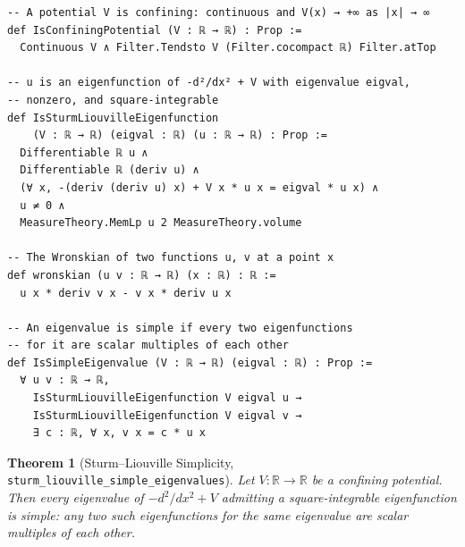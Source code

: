 \documentclass[12pt, a4paper]{article}
\theoremstyle{plain}
\newtheorem{theorem}{Theorem}[section]
\theoremstyle{definition}
\newcommand{\R}{\mathbb{R}}
\newcommand{\lean}[1]{\texttt{#1}}
\begin{document}
\begin{lstlisting}[language=Lean4]
-- A potential V is confining: continuous and V(x) → +∞ as |x| → ∞
def IsConfiningPotential (V : ℝ → ℝ) : Prop :=
  Continuous V ∧ Filter.Tendsto V (Filter.cocompact ℝ) Filter.atTop

-- u is an eigenfunction of -d²/dx² + V with eigenvalue eigval,
-- nonzero, and square-integrable
def IsSturmLiouvilleEigenfunction
    (V : ℝ → ℝ) (eigval : ℝ) (u : ℝ → ℝ) : Prop :=
  Differentiable ℝ u ∧
  Differentiable ℝ (deriv u) ∧
  (∀ x, -(deriv (deriv u) x) + V x * u x = eigval * u x) ∧
  u ≠ 0 ∧
  MeasureTheory.MemLp u 2 MeasureTheory.volume

-- The Wronskian of two functions u, v at a point x
def wronskian (u v : ℝ → ℝ) (x : ℝ) : ℝ :=
  u x * deriv v x - v x * deriv u x

-- An eigenvalue is simple if every two eigenfunctions
-- for it are scalar multiples of each other
def IsSimpleEigenvalue (V : ℝ → ℝ) (eigval : ℝ) : Prop :=
  ∀ u v : ℝ → ℝ,
    IsSturmLiouvilleEigenfunction V eigval u →
    IsSturmLiouvilleEigenfunction V eigval v →
    ∃ c : ℝ, ∀ x, v x = c * u x
\end{lstlisting}

\begin{theorem}[Sturm--Liouville Simplicity, \lean{sturm\_liouville\_simple\_eigenvalues}]
\label{thm:sl_simplicity}
Let $V \colon \R \to \R$ be a confining potential.
Then every eigenvalue of $-d^2/dx^2 + V$ admitting a square-integrable
eigenfunction is simple: any two such eigenfunctions for the same
eigenvalue are scalar multiples of each other.
\end{theorem}
\end{document}
